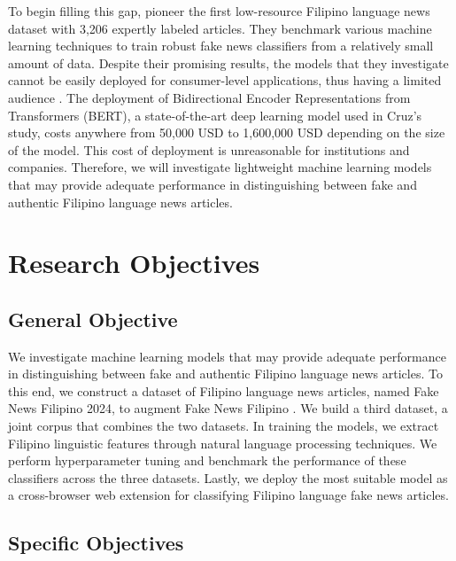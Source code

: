 To begin filling this gap,  pioneer the first low-resource Filipino language news dataset with 3,206 expertly labeled articles. They benchmark various machine learning techniques to train robust fake news classifiers from a relatively small amount of data. Despite their promising results, the models that they investigate cannot be easily deployed for consumer-level applications, thus having a limited audience . The deployment of Bidirectional Encoder Representations from Transformers (BERT), a state-of-the-art deep learning model used in Cruz's study, costs anywhere from 50,000 USD to 1,600,000 USD \cite{paleyes-2022} depending on the size of the model. This cost of deployment is unreasonable for institutions and companies. Therefore, we will investigate lightweight machine learning models that may provide adequate performance in distinguishing between fake and authentic Filipino language news articles.

\section{Research Objectives}
\label{sec:researchobjectives}

\subsection{General Objective}
\label{sec:generalobjective}

We investigate machine learning models that may provide adequate performance in distinguishing between fake and authentic Filipino language news articles. To this end, we construct a dataset of Filipino language news articles, named Fake News Filipino 2024, to augment Fake News Filipino \cite{fake-news-filipino}. We build a third dataset, a joint corpus that combines the two datasets. In training the models, we extract Filipino linguistic features \cite{imperial-2020, imperial-2021} through natural language processing techniques. We perform hyperparameter tuning and benchmark the performance of these classifiers across the three datasets. Lastly, we deploy the most suitable model as a cross-browser web extension for classifying Filipino language fake news articles.

\subsection{Specific Objectives}
\label{sec:specificobjectives}

